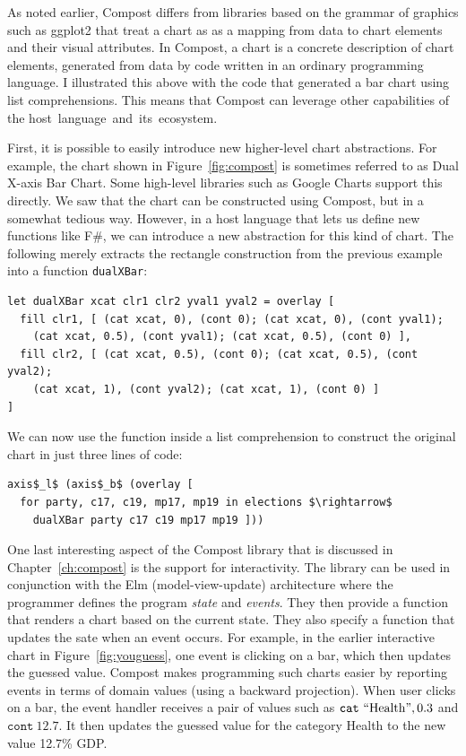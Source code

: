 \documentclass[fleqn,11pt]{report}
\theoremstyle{definition}
\begin{document}
As noted earlier, Compost differs from libraries based on the
grammar of graphics such as ggplot2 \citep{wickham-2016-ggplot2} that treat a chart as
as a mapping from data to chart elements and their visual attributes. In Compost,
a chart is a concrete description of chart elements, generated from data by code
written in an ordinary programming language. I illustrated this above with the code that
generated a bar chart using list comprehensions. This means that Compost
can leverage other capabilities of the host~language~and~its~ecosystem.

First, it is possible to easily introduce new higher-level chart abstractions. For example,
the chart shown in Figure~\ref{fig:compost} is sometimes referred to as Dual X-axis Bar Chart.
Some high-level libraries such as Google Charts support this directly. We saw that the
chart can be constructed using Compost, but in a somewhat tedious way. However, in a host
language that lets us define new functions like F\#, we can introduce a new abstraction
for this kind of chart. The following merely extracts the rectangle construction from the
previous example into a function \texttt{dualXBar}:

\begin{lstlisting}[language=sharp,mathescape=true]
let dualXBar xcat clr1 clr2 yval1 yval2 = overlay [
  fill clr1, [ (cat xcat, 0), (cont 0); (cat xcat, 0), (cont yval1);
    (cat xcat, 0.5), (cont yval1); (cat xcat, 0.5), (cont 0) ],
  fill clr2, [ (cat xcat, 0.5), (cont 0); (cat xcat, 0.5), (cont yval2);
    (cat xcat, 1), (cont yval2); (cat xcat, 1), (cont 0) ]
]
\end{lstlisting}

\noindent
We can now use the function inside a list comprehension to construct the original chart
in just three lines of code:

\begin{lstlisting}[language=sharp,mathescape=true]
axis$_l$ (axis$_b$ (overlay [
  for party, c17, c19, mp17, mp19 in elections $\rightarrow$
    dualXBar party c17 c19 mp17 mp19 ]))
\end{lstlisting}

\noindent
One last interesting aspect of the Compost library that is discussed in Chapter~\ref{ch:compost}
is the support for interactivity. The library can be used in conjunction with the
Elm (model-view-update) architecture \citep{czaplicki-2016-mvu} where the programmer defines
the program \emph{state} and \emph{events}. They then provide a function that renders
a chart based on the current state. They also specify a function that updates the sate when
an event occurs. For example, in the earlier interactive chart in Figure~\ref{fig:youguess},
one event is clicking on a bar, which then updates the guessed value. Compost makes programming
such charts easier by reporting events in terms of domain values (using a backward projection).
When user clicks on a bar, the event handler receives a pair of values such as
$\texttt{cat}~\textnormal{``Health''}, 0.3$ and $\texttt{cont}~12.7$. It then updates the
guessed value for the category Health to the new value 12.7\% GDP.
\end{document}

